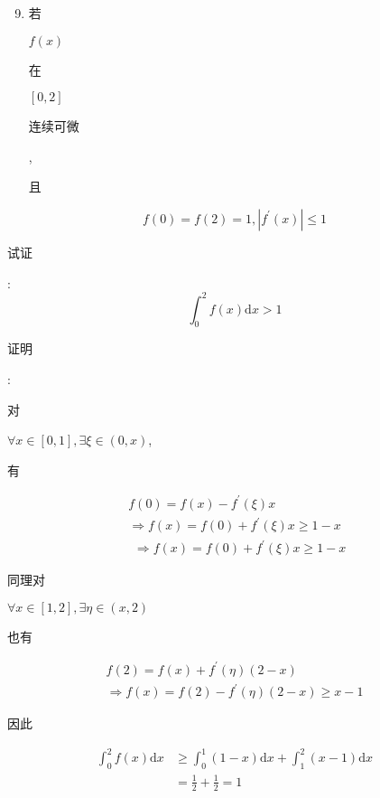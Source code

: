 \documentclass[10pt]{article}
\begin{document}
\begin{enumerate}
  \setcounter{enumi}{8}
  \item \begin{CJK}{UTF8}{mj}若\end{CJK} $f(x)$ \begin{CJK}{UTF8}{mj}在\end{CJK} $[0,2]$ \begin{CJK}{UTF8}{mj}连续可微\end{CJK}, \begin{CJK}{UTF8}{mj}且\end{CJK}
\end{enumerate}
$$
f(0)=f(2)=1,\left|f^{\prime}(x)\right| \leqslant 1
$$
\begin{CJK}{UTF8}{mj}试证\end{CJK}:
$$
\int_{0}^{2} f(x) \mathrm{d} x>1
$$
\begin{CJK}{UTF8}{mj}证明\end{CJK}: \begin{CJK}{UTF8}{mj}对\end{CJK} $\forall x \in[0,1], \exists \xi \in(0, x)$, \begin{CJK}{UTF8}{mj}有\end{CJK}
$$
\begin{gathered}
f(0)=f(x)-f^{\prime}(\xi) x \\
\Rightarrow f(x)=f(0)+f^{\prime}(\xi) x \geq 1-x
\end{gathered}
$$
$$
\begin{aligned}
& \Rightarrow f(x)=f(0)+f^{\prime}(\xi) x \geq 1-x
\end{aligned}
$$
\begin{CJK}{UTF8}{mj}同理对\end{CJK} $\forall x \in[1,2], \exists \eta \in(x, 2)$ \begin{CJK}{UTF8}{mj}也有\end{CJK}
$$
\begin{gathered}
f(2)=f(x)+f^{\prime}(\eta)(2-x) \\
\Rightarrow f(x)=f(2)-f^{\prime}(\eta)(2-x) \geq x-1
\end{gathered}
$$
\begin{CJK}{UTF8}{mj}因此\end{CJK}
$$
\begin{aligned}
\int_{0}^{2} f(x) \mathrm{d} x & \geqslant \int_{0}^{1}(1-x) \mathrm{d} x+\int_{1}^{2}(x-1) \mathrm{d} x \\
&=\frac{1}{2}+\frac{1}{2}=1
\end{aligned}
$$
\end{document}
